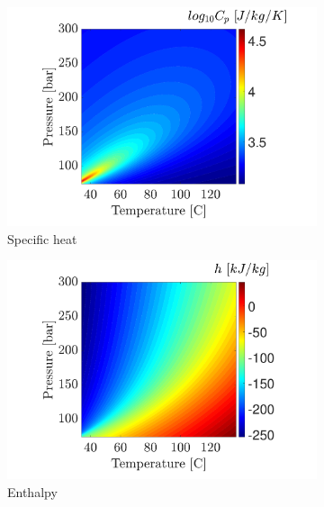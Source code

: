 \documentclass[../Article_Sensitivity_Analsysis.tex]{subfiles}
\begin{document}
\begin{figure}[H]
\begin{subfigure}[b]{0.32\textwidth}
			\includegraphics[trim = 3.5cm 0cm 1.5cm 0cm,clip,width=\textwidth]{Figures/CP.pdf}	
			\caption{Specific heat}
			\label{fig: SFE_Properties_CP}
		\end{subfigure}
		\hfill
		\begin{subfigure}[b]{0.32\textwidth}
			\centering
			\includegraphics[trim = 3.5cm 0cm 1.5cm 0cm,clip,width=\textwidth]{Figures/Enthalpy.pdf}	
			\caption{Enthalpy}
			\label{fig: SFE_Properties_h}
		\end{subfigure}
		\hfill
		\begin{subfigure}[b]{0.32\textwidth}
			\centering

\end{subfigure}
\end{figure}
\end{document}
